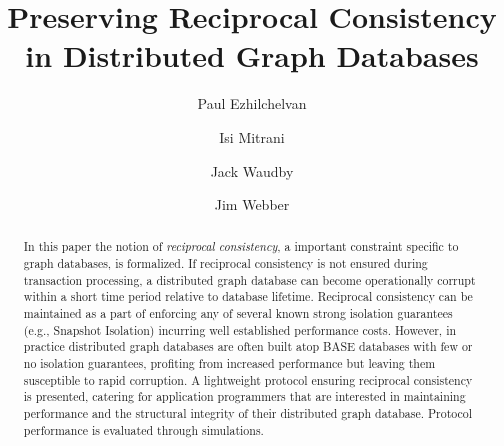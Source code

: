 \documentclass[sigplan,10pt]{acmart}
\begin{document}
\title{Preserving Reciprocal Consistency in Distributed Graph Databases}

\author{Paul Ezhilchelvan}

\author{Isi Mitrani}

\author{Jack Waudby}

\author{Jim Webber}


\renewcommand{\shortauthors}{Ezhilchelvan, et al.}

\begin{abstract}
  In this paper the notion of \textit{reciprocal consistency}, a important constraint specific to graph databases, is formalized. If reciprocal consistency is not ensured during transaction processing, a distributed graph database can become operationally corrupt within a short time period relative to database lifetime. Reciprocal consistency can be maintained as a part of enforcing any of several known strong isolation guarantees (e.g., Snapshot Isolation) incurring well established performance costs. However, in practice distributed graph databases are often built atop BASE databases with few or no isolation guarantees, profiting from increased performance but leaving them susceptible to rapid corruption. A lightweight protocol ensuring reciprocal consistency is presented, catering for application programmers that are interested in maintaining performance and the structural integrity of their distributed graph database. Protocol performance is evaluated through simulations.
\end{abstract}
\end{document}
